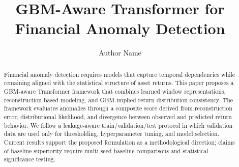 \documentclass[11pt]{article}
\title{GBM-Aware Transformer for Financial Anomaly Detection}
\author{Author Name}
\date{}
\begin{document}
\maketitle

\begin{abstract}
Financial anomaly detection requires models that capture temporal dependencies while remaining aligned with the statistical structure of asset returns. This paper proposes a GBM-aware Transformer framework that combines learned window representations, reconstruction-based modeling, and GBM-implied return distribution consistency. The framework evaluates anomalies through a composite score derived from reconstruction error, distributional likelihood, and divergence between observed and predicted return behavior. We follow a leakage-aware train/validation/test protocol in which validation data are used only for thresholding, hyperparameter tuning, and model selection. Current results support the proposed formulation as a methodological direction; claims of baseline superiority require multi-seed baseline comparisons and statistical significance testing.
\end{abstract}









\end{document}
